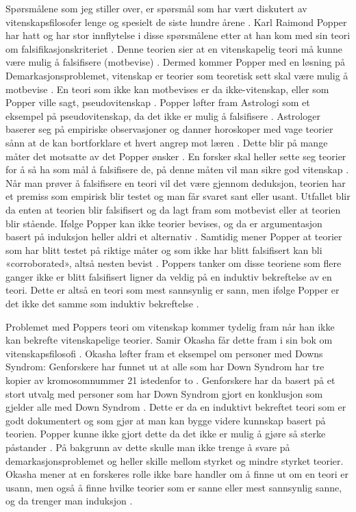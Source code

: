 \documentclass[
]{book}
\begin{document}
Spørsmålene som jeg stiller over, er spørsmål som har vært diskutert av vitenskapsfilosofer lenge og spesielt de siste hundre årene \citep{okasha2016}. Karl Raimond Popper har hatt og har stor innflytelse i disse spørsmålene etter at han kom med sin teori om falsifikasjonskriteriet \citep{okasha2016}. Denne teorien sier at en vitenskapelig teori må kunne være mulig å falsifisere (motbevise) \citep{popper2002}. Dermed kommer Popper med en løsning på Demarkasjonsproblemet, vitenskap er teorier som teoretisk sett skal være mulig å motbevise \citep{popper2002}. En teori som ikke kan motbevises er da ikke-vitenskap, eller som Popper ville sagt, pseudovitenskap \citep{popper2002}. Popper løfter fram Astrologi som et eksempel på pseudovitenskap, da det ikke er mulig å falsifisere \citep{popper2002}. Astrologer baserer seg på empiriske observasjoner og danner horoskoper med vage teorier sånn at de kan bortforklare et hvert angrep mot læren \citep{popper2002}. Dette blir på mange måter det motsatte av det Popper ønsker \citep{popper2002}. En forsker skal heller sette seg teorier for å så ha som mål å falsifisere de, på denne måten vil man sikre god vitenskap \citep{popper2002}. Når man prøver å falsifisere en teori vil det være gjennom deduksjon, teorien har et premiss som empirisk blir testet og man får svaret sant eller usant. Utfallet blir da enten at teorien blir falsifisert og da lagt fram som motbevist eller at teorien blir stående. Ifølge Popper kan ikke teorier bevises, og da er argumentasjon basert på induksjon heller aldri et alternativ \citep{okasha2016}. Samtidig mener Popper at teorier som har blitt testet på riktige måter og som ikke har blitt falsifisert kan bli «corroborated», altså nesten bevist \citep{popper2002}. Poppers tanker om disse teoriene som flere ganger ikke er blitt falsifisert ligner da veldig på en induktiv bekreftelse av en teori. Dette er altså en teori som mest sannsynlig er sann, men ifølge Popper er det ikke det samme som induktiv bekreftelse \citep{okasha2016, popper2002}.

Problemet med Poppers teori om vitenskap kommer tydelig fram når han ikke kan bekrefte vitenskapelige teorier. Samir Okasha får dette fram i sin bok om vitenskapsfilosofi \citep{okasha2016}. Okasha løfter fram et eksempel om personer med Downs Syndrom: Genforskere har funnet ut at alle som har Down Syndrom har tre kopier av kromosomnummer 21 istedenfor to \citep[s. 18]{okasha2016}. Genforskere har da basert på et stort utvalg med personer som har Down Syndrom gjort en konklusjon som gjelder alle med Down Syndrom \citep{okasha2016}. Dette er da en induktivt bekreftet teori som er godt dokumentert og som gjør at man kan bygge videre kunnskap basert på teorien. Popper kunne ikke gjort dette da det ikke er mulig å gjøre så sterke påstander \citep{okasha2016}. På bakgrunn av dette skulle man ikke trenge å svare på demarkasjonsproblemet og heller skille mellom styrket og mindre styrket teorier. Okasha mener at en forskeres rolle ikke bare handler om å finne ut om en teori er usann, men også å finne hvilke teorier som er sanne eller mest sannsynlig sanne, og da trenger man induksjon \citep[s. 19-20]{okasha2016}.
\end{document}
